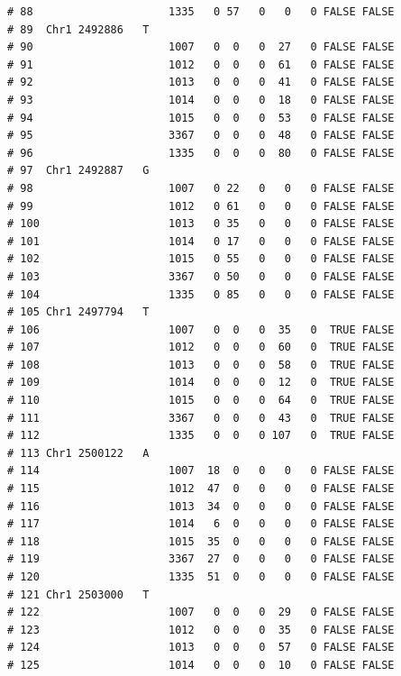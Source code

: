 \documentclass{article}\usepackage[]{graphicx}\usepackage[]{color}
\makeatletter
\newenvironment{kframe}{%
 \def\at@end@of@kframe{}%
 \ifinner\ifhmode%
  \def\at@end@of@kframe{\end{minipage}}%
  \begin{minipage}{\columnwidth}%
 \fi\fi%
 \def\FrameCommand##1{\hskip\@totalleftmargin \hskip-\fboxsep
 \colorbox{shadecolor}{##1}\hskip-\fboxsep
     \hskip-\linewidth \hskip-\@totalleftmargin \hskip\columnwidth}%
 \MakeFramed {\advance\hsize-\width
   \@totalleftmargin\z@ \linewidth\hsize
   \@setminipage}}%
 {\par\unskip\endMakeFramed%
 \at@end@of@kframe}
\newenvironment{knitrout}{}{} %
\makeatother
\begin{document}
\begin{knitrout}
\begin{kframe}
\begin{verbatim}
# 88                     1335   0 57   0   0   0 FALSE FALSE        
# 89  Chr1 2492886   T                                              
# 90                     1007   0  0   0  27   0 FALSE FALSE        
# 91                     1012   0  0   0  61   0 FALSE FALSE        
# 92                     1013   0  0   0  41   0 FALSE FALSE        
# 93                     1014   0  0   0  18   0 FALSE FALSE        
# 94                     1015   0  0   0  53   0 FALSE FALSE        
# 95                     3367   0  0   0  48   0 FALSE FALSE        
# 96                     1335   0  0   0  80   0 FALSE FALSE        
# 97  Chr1 2492887   G                                              
# 98                     1007   0 22   0   0   0 FALSE FALSE        
# 99                     1012   0 61   0   0   0 FALSE FALSE        
# 100                    1013   0 35   0   0   0 FALSE FALSE        
# 101                    1014   0 17   0   0   0 FALSE FALSE        
# 102                    1015   0 55   0   0   0 FALSE FALSE        
# 103                    3367   0 50   0   0   0 FALSE FALSE        
# 104                    1335   0 85   0   0   0 FALSE FALSE        
# 105 Chr1 2497794   T                                              
# 106                    1007   0  0   0  35   0  TRUE FALSE        
# 107                    1012   0  0   0  60   0  TRUE FALSE        
# 108                    1013   0  0   0  58   0  TRUE FALSE        
# 109                    1014   0  0   0  12   0  TRUE FALSE        
# 110                    1015   0  0   0  64   0  TRUE FALSE        
# 111                    3367   0  0   0  43   0  TRUE FALSE        
# 112                    1335   0  0   0 107   0  TRUE FALSE        
# 113 Chr1 2500122   A                                              
# 114                    1007  18  0   0   0   0 FALSE FALSE        
# 115                    1012  47  0   0   0   0 FALSE FALSE        
# 116                    1013  34  0   0   0   0 FALSE FALSE        
# 117                    1014   6  0   0   0   0 FALSE FALSE        
# 118                    1015  35  0   0   0   0 FALSE FALSE        
# 119                    3367  27  0   0   0   0 FALSE FALSE        
# 120                    1335  51  0   0   0   0 FALSE FALSE        
# 121 Chr1 2503000   T                                              
# 122                    1007   0  0   0  29   0 FALSE FALSE        
# 123                    1012   0  0   0  35   0 FALSE FALSE        
# 124                    1013   0  0   0  57   0 FALSE FALSE        
# 125                    1014   0  0   0  10   0 FALSE FALSE        

\end{verbatim}
\end{kframe}
\end{knitrout}
\end{document}
